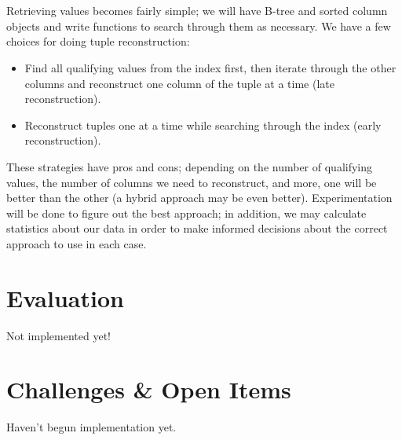 \documentclass[12pt]{article}
\begin{document}
\\\\Retrieving values becomes fairly simple; we will have B-tree and sorted column objects and write functions to search through them as necessary.  We have a few choices for doing tuple reconstruction:
\begin{itemize}
\item Find all qualifying values from the index first, then iterate through the other columns and reconstruct one column of the tuple at a time (late reconstruction).
\item Reconstruct tuples one at a time while searching through the index (early reconstruction).
\end{itemize}
These strategies have pros and cons; depending on the number of qualifying values, the number of columns we need to reconstruct, and more, one will be better than the other (a hybrid approach may be even better).  Experimentation will be done to figure out the best approach; in addition, we may calculate statistics about our data in order to make informed decisions about the correct approach to use in each case.

\section{Evaluation}
Not implemented yet!

\section{Challenges \& Open Items}
Haven't begun implementation yet.
\end{document}
